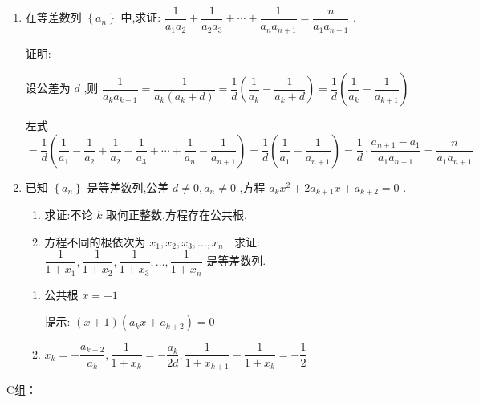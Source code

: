 \begin{enumerate}
    \item 在等差数列 $\left\{  {a}_{n}\right\}$ 中,求证: $\dfrac{1}{{a}_{1}{a}_{2}} + \dfrac{1}{{a}_{2}{a}_{3}} + \cdots  + \dfrac{1}{{a}_{n}{a}_{n + 1}} = \dfrac{n}{{a}_{1}{a}_{n + 1}}$ .
    \begin{jieda}
        证明: 
        
        设公差为 $ d $ ,则 $ \dfrac{1}{{a}_{k}{a}_{k + 1}} = \dfrac{1}{{a}_{k}\left( {{a}_{k} + d}\right) } = \dfrac{1}{d}\left( {\dfrac{1}{{a}_{k}} - \dfrac{1}{{a}_{k} + d}}\right)  = \dfrac{1}{d}\left( {\dfrac{1}{{a}_{k}} - \dfrac{1}{{a}_{k + 1}}}\right) $

        左式 $ = \dfrac{1}{d}\left( {\dfrac{1}{{a}_{1}} - \dfrac{1}{{a}_{2}} + \dfrac{1}{{a}_{2}} - \dfrac{1}{{a}_{3}} + \cdots  + \dfrac{1}{{a}_{n}} - \dfrac{1}{{a}_{n + 1}}}\right)  = \dfrac{1}{d}\left( {\dfrac{1}{{a}_{1}} - \dfrac{1}{{a}_{n + 1}}}\right)  = \dfrac{1}{d} \cdot  \dfrac{{a}_{n + 1} - {a}_{1}}{{a}_{1}{a}_{n + 1}} = \dfrac{n}{{a}_{1}{a}_{n + 1}} $
    \end{jieda}

    \item 已知 $\left\{  {a}_{n}\right\}$ 是等差数列,公差 $d \neq  0, a_{n} \neq  0$ ,方程 ${a}_{k}{x}^{2} + 2a_{k + 1}x + {a}_{k + 2} = 0$ .
    \begin{enumerate}
        \item 求证:不论 $k$ 取何正整数,方程存在公共根.
        \item 方程不同的根依次为 ${x}_{1},{x}_{2},{x}_{3},\ldots ,{x}_{n}$ . 求证: $\dfrac{1}{1 + {x}_{1}},\dfrac{1}{1 + {x}_{2}},\dfrac{1}{1 + {x}_{3}},\ldots ,\dfrac{1}{1 + {x}_{n}}$ 是等差数列.
    \end{enumerate}
    \begin{jieda}
        \begin{enumerate}
            \item 公共根 $x =  - 1$
            
            提示: $\left( {x + 1}\right) \left( {{a}_{k}x + {a}_{k + 2}}\right)  = 0$
            \item ${x}_{k} =  - \dfrac{{a}_{k + 2}}{{a}_{k}},\dfrac{1}{1 + {x}_{k}} =  - \dfrac{{a}_{k}}{2d},\dfrac{1}{1 + {x}_{k + 1}} - \dfrac{1}{1 + {x}_{k}} =  - \dfrac{1}{2}$
        \end{enumerate}
    \end{jieda}
\end{enumerate}
C组：
